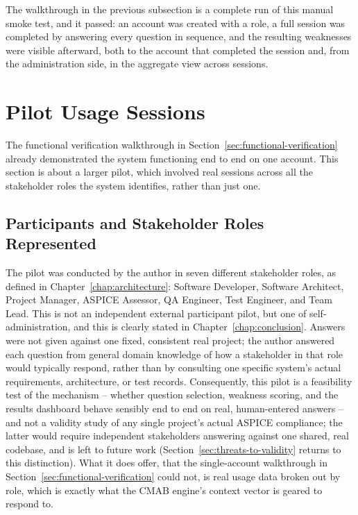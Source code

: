 \documentclass[a4paper, 12pt, oneside, openany, BCOR1cm,toc=chapterentrywithdots]{scrbook}
\begin{document}
The walkthrough in the previous subsection is a complete run of this manual smoke test, and it
passed: an account was created with a role, a full session was completed by answering every
question in sequence, and the resulting weaknesses were visible afterward, both to the account
that completed the session and, from the administration side, in the aggregate view across
sessions.
\section{Pilot Usage Sessions}

The functional verification walkthrough in Section~\ref{sec:functional-verification} already
demonstrated the system functioning end to end on one account. This section is about a larger
pilot, which involved real sessions across all the stakeholder roles the system identifies,
rather than just one.

\subsection{Participants and Stakeholder Roles Represented}
\label{sec:pilot-participants}

The pilot was conducted by the author in seven different stakeholder roles, as defined in
Chapter~\ref{chap:architecture}: Software Developer, Software Architect, Project Manager,
ASPICE Assessor, QA Engineer, Test Engineer, and Team Lead. This is not an independent external
participant pilot, but one of self-administration, and this is clearly stated in
Chapter~\ref{chap:conclusion}. Answers were not given against one fixed, consistent real
project; the author answered each question from general domain knowledge of how a stakeholder in
that role would typically respond, rather than by consulting one specific system's actual
requirements, architecture, or test records. Consequently, this pilot is a feasibility test of
the mechanism -- whether question selection, weakness scoring, and the results dashboard behave
sensibly end to end on real, human-entered answers -- and not a validity study of any single
project's actual ASPICE compliance; the latter would require independent stakeholders answering
against one shared, real codebase, and is left to future work
(Section~\ref{sec:threats-to-validity} returns to this distinction). What it does offer, that the
single-account walkthrough in Section~\ref{sec:functional-verification} could not, is real usage
data broken out by role, which is exactly what the CMAB engine's context vector is geared to
respond to.
\end{document}
